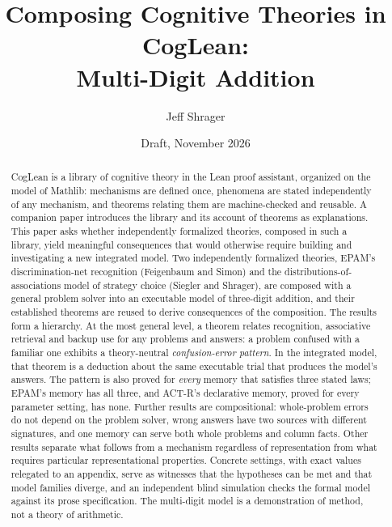 \documentclass[11pt]{article}
\title{Composing Cognitive Theories in CogLean:\\Multi-Digit Addition}
\author{Jeff Shrager}
\date{Draft, November 2026}
\begin{document}
\sloppy
\maketitle

\begin{center}
\end{center}
\medskip

\begin{abstract}
CogLean is a library of cognitive theory in the Lean proof assistant, organized on the model of Mathlib: mechanisms are defined once, phenomena are stated independently of any mechanism, and theorems relating them are machine-checked and reusable. A companion paper introduces the library and its account of theorems as explanations. This paper asks whether independently formalized theories, composed in such a library, yield meaningful consequences that would otherwise require building and investigating a new integrated model. Two independently formalized theories, EPAM's discrimination-net recognition (Feigenbaum and Simon) and the distributions-of-associations model of strategy choice (Siegler and Shrager), are composed with a general problem solver into an executable model of three-digit addition, and their established theorems are reused to derive consequences of the composition. The results form a hierarchy. At the most general level, a theorem relates recognition, associative retrieval and backup use for any problems and answers: a problem confused with a familiar one exhibits a theory-neutral \emph{confusion-error pattern}. In the integrated model, that theorem is a deduction about the same executable trial that produces the model's answers. The pattern is also proved for \emph{every} memory that satisfies three stated laws; EPAM's memory has all three, and ACT-R's declarative memory, proved for every parameter setting, has none. Further results are compositional: whole-problem errors do not depend on the problem solver, wrong answers have two sources with different signatures, and one memory can serve both whole problems and column facts. Other results separate what follows from a mechanism regardless of representation from what requires particular representational properties. Concrete settings, with exact values relegated to an appendix, serve as witnesses that the hypotheses can be met and that model families diverge, and an independent blind simulation checks the formal model against its prose specification. The multi-digit model is a demonstration of method, not a theory of arithmetic.
\end{abstract}
\end{document}
